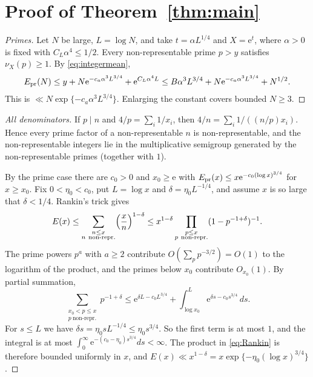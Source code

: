 \documentclass[10pt,reqno]{amsart}
\theoremstyle{remark}
\newcommand{\e}{\mathrm e}
\begin{document}
\section{Proof of Theorem~\ref{thm:main}}\label{sec:all}
\begin{proof}[Primes]
Let $N$ be large, $L=\log N$, and take $t=\alpha L^{1/4}$ and $X=\e^t$,
where $\alpha>0$ is fixed with $C_L\alpha^4\leq1/2$.  Every
non-representable prime $p>y$ satisfies $\nu_X(p)\geq1$.  By
\eqref{eq:integermean},
\[
 E_{\rm pr}(N)\leq y+N\e^{-c_a\alpha^3L^{3/4}}+\e^{C_L\alpha^4L}
 \leq B\alpha^3L^{3/4}+N\e^{-c_a\alpha^3L^{3/4}}+N^{1/2}.
\]
This is $\ll N\exp\{-c_a\alpha^3L^{3/4}\}$.  Enlarging the constant covers
bounded $N\geq3$.
\end{proof}

\begin{proof}[All denominators]
If $p\mid n$ and $4/p=\sum_i1/x_i$, then $4/n=\sum_i1/((n/p)x_i)$.  Hence
every prime factor of a non-representable $n$ is non-representable, and
the non-representable integers lie in the multiplicative semigroup
generated by the non-representable primes (together with $1$).

By the prime case there are $c_0>0$ and $x_0\geq\e$ with
$E_{\rm pr}(x)\leq x\e^{-c_0(\log x)^{3/4}}$ for $x\geq x_0$.  Fix
$0<\eta_0<c_0$, put $L=\log x$ and $\delta=\eta_0L^{-1/4}$, and assume $x$
is so large that $\delta<1/4$.  Rankin's trick gives
\begin{equation}\label{eq:Rankin}
 E(x)\leq\sum_{\substack{n\leq x\\n\ \text{non-repr.}}}\Bigl(\frac xn\Bigr)^{1-\delta}
 \leq x^{1-\delta}\prod_{\substack{p\leq x\\p\ \text{non-repr.}}}
 (1-p^{-1+\delta})^{-1}.
\end{equation}
The prime powers $p^a$ with $a\geq2$ contribute $O(\sum_pp^{-3/2})=O(1)$ to
the logarithm of the product, and the primes below $x_0$ contribute
$O_{x_0}(1)$.  By partial summation,
\[
 \sum_{\substack{x_0<p\leq x\\p\ \text{non-repr.}}}p^{-1+\delta}
 \leq\e^{\delta L-c_0L^{3/4}}+\int_{\log x_0}^{L}\e^{\delta s-c_0s^{3/4}}\,ds .
\]
For $s\leq L$ we have $\delta s=\eta_0sL^{-1/4}\leq\eta_0s^{3/4}$.  So the
first term is at most $1$, and the integral is at most
$\int_0^\infty\e^{-(c_0-\eta_0)s^{3/4}}ds<\infty$.  The product in
\eqref{eq:Rankin} is therefore bounded uniformly in $x$, and
$E(x)\ll x^{1-\delta}=x\exp\{-\eta_0(\log x)^{3/4}\}$.
\end{proof}
\end{document}
